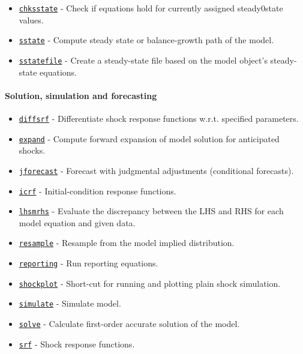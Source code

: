 \begin{itemize}
\itemsep1pt\parskip0pt
\item
  \href{model/chksstate}{\texttt{chksstate}} - Check if equations hold
  for currently assigned steady0state values.
\item
  \href{model/sstate}{\texttt{sstate}} - Compute steady state or
  balance-growth path of the model.
\item
  \href{model/sstatefile}{\texttt{sstatefile}} - Create a steady-state
  file based on the model object's steady-state equations.
\end{itemize}

\paragraph{Solution, simulation and
forecasting}\label{solution-simulation-and-forecasting}

\begin{itemize}
\itemsep1pt\parskip0pt
\item
  \href{model/diffsrf}{\texttt{diffsrf}} - Differentiate shock response
  functions w.r.t. specified parameters.
\item
  \href{model/expand}{\texttt{expand}} - Compute forward expansion of
  model solution for anticipated shocks.
\item
  \href{model/jforecast}{\texttt{jforecast}} - Forecast with judgmental
  adjustments (conditional forecasts).
\item
  \href{model/icrf}{\texttt{icrf}} - Initial-condition response
  functions.
\item
  \href{model/lhsmrhs}{\texttt{lhsmrhs}} - Evaluate the discrepancy
  between the LHS and RHS for each model equation and given data.
\item
  \href{model/resample}{\texttt{resample}} - Resample from the model
  implied distribution.
\item
  \href{model/reporting}{\texttt{reporting}} - Run reporting equations.
\item
  \href{model/shockplot}{\texttt{shockplot}} - Short-cut for running and
  plotting plain shock simulation.
\item
  \href{model/simulate}{\texttt{simulate}} - Simulate model.
\item
  \href{model/solve}{\texttt{solve}} - Calculate first-order accurate
  solution of the model.
\item
  \href{model/srf}{\texttt{srf}} - Shock response functions.
\end{itemize}

